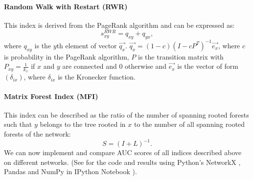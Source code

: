 \documentclass{llncs}
\begin{document}
\paragraph{Random Walk with Restart (RWR)}
%
This index is derived from the PageRank algorithm and can be expressed as:
\begin{equation}
s_{xy}^{RWR} = q_{xy} + q_{yx},
\end{equation}
where $q_{xy}$ is the $y$th element of vector $\overrightarrow{q_x}$. $\overrightarrow{q_x} = (1 - c)(I - cP^{T})^{-1} \overrightarrow{e_x}$, where $c$ is probability in the PageRank algorithm, $P$ is the transition matrix with $P_{xy} = \frac{1}{k_x}$ if $x$ and $y$ are connected and $0$ otherwise and $\overrightarrow{e_x}$ is the vector of form $(\delta_{ix})$, where $\delta_{ix}$ is the Kronecker function. 
%
\paragraph{Matrix Forest Index (MFI) \cite{mf-index}}
%
This index can be described as the ratio of the number of spanning rooted forests such that $y$ belongs to the tree rooted in $x$ to the number of all spanning rooted forests of the network:
\begin{equation}
S = (I + L)^{-1}.
\end{equation}
%
We can now implement and compare AUC scores of all indices described above on different networks. (See \cite{ipynb-auc} for the code and results using Python's NetworkX \cite{networkx}, Pandas \cite{pandas} and NumPy \cite{numpy} in IPython Notebook \cite{ipython}).
%
\setlength{\tabcolsep}{5pt}
\renewcommand{\arraystretch}{1.5}
\end{document}

